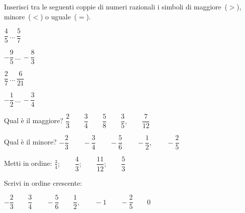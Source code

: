 \subsubsection*{}

\begin{esercizio}
 \label{ese:3.29}
Inserisci tra le seguenti coppie di numeri razionali i simboli di 
maggiore~(\(>\)), minore~(\(<\)) o uguale~(\(=\)).
\begin{multicols}{4}
\begin{enumeratea}
\spazielenx
 \item \(\dfrac{4}{5}\,\ldots\,\dfrac{5}{7}\)
 \item \(-\dfrac{9}{5}\,\ldots\,-\dfrac{8}{3}\)
 \item \(\dfrac{2}{7}\,\ldots\,\dfrac{6}{21}\)
 \item \(-\dfrac{1}{2}\,\ldots\,-\dfrac{3}{4}\)
\end{enumeratea}
\end{multicols}
\end{esercizio}
\newpage
\begin{esercizio}
 \label{ese:3.30}
Qual è il maggiore? \qquad 
\(\dfrac{2}{3} \qquad \dfrac{3}{4} \qquad \dfrac{5}{8} \qquad \dfrac{3}{5},
\qquad \dfrac{7}{12}\)
\end{esercizio}


\begin{esercizio}
 \label{ese:3.31}
Qual è il minore? \qquad 
\(-\dfrac{2}{3} \qquad -\dfrac{3}{4} \qquad -\dfrac{5}{6} \qquad 
-\dfrac{1}{2}, \qquad -\dfrac{2}{5}\)
\end{esercizio}

\begin{esercizio}
\label{ese:3.35}
Metti in ordine: \qquad
\(\frac{3}{4};\qquad\dfrac{4}{3};\qquad\dfrac{11}{12};\qquad\dfrac{5}{3}\)
\end{esercizio}

\begin{esercizio}
 \label{ese:3.32}
Scrivi in ordine crescente:

\vspace{.3em}
\(-\dfrac{2}{3} \qquad \dfrac{3}{4} \qquad -\dfrac{5}{6} \qquad \dfrac{1}{2},
\qquad -1 \qquad -\dfrac{2}{5} \qquad 0\)
\end{esercizio}

